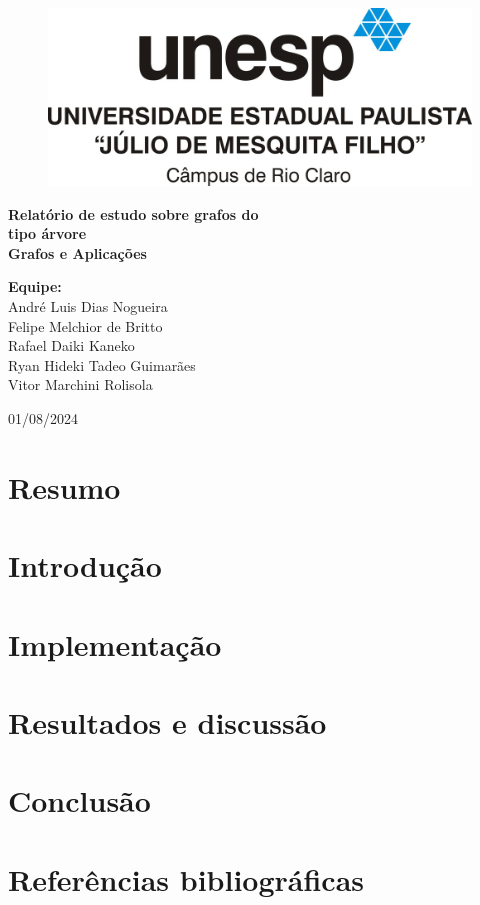 \documentclass[12pt, a4paper]{scrreprt}
\begin{document}
\begin{titlepage}
    \centering
    \begin{figure}[h]
        \centering
        \includegraphics[width=.75\textwidth]{src/logo_unesp.jpg}
        \label{fig:logo_unesp}
    \end{figure}
    \vfill
    \Huge\textbf{Relatório de estudo sobre grafos do \\ tipo árvore}\\[1.5cm]
    \Large\textbf{Grafos e Aplicações}\\[1.5cm]
    \vfill
    \begin{flushleft}
        \textbf{Equipe:}\\
        \hspace{1.5cm}André Luis Dias Nogueira \\ 
        \hspace{1.5cm}Felipe Melchior de Britto \\
        \hspace{1.5cm}Rafael Daiki Kaneko \\
        \hspace{1.5cm}Ryan Hideki Tadeo Guimarães \\
        \hspace{1.5cm}Vitor Marchini Rolisola \\
    \end{flushleft}
    \vfill
    01/08/2024\\
\end{titlepage}

\tableofcontents
\newpage

\chapter{Resumo}

\chapter{Introdução}

\chapter{Implementação}

\chapter{Resultados e discussão}

\chapter{Conclusão}

\chapter{Referências bibliográficas}
\end{document}
